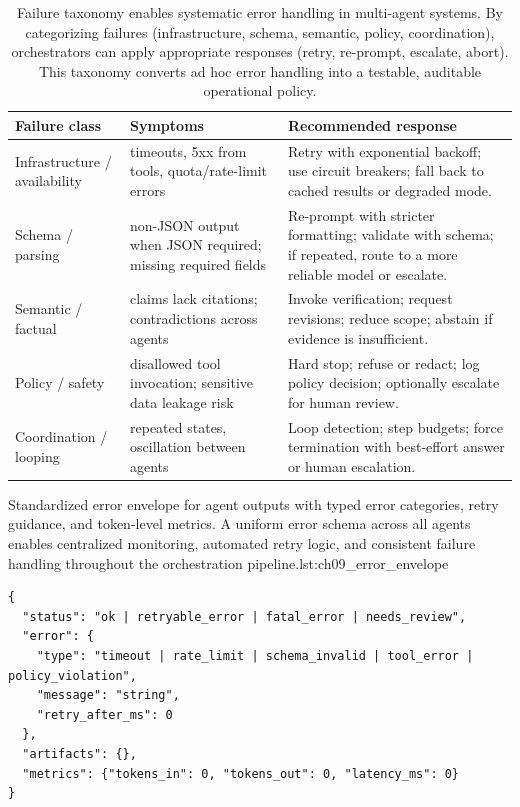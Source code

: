 \begin{table}[t]
\centering
\small
\caption{Failure taxonomy enables systematic error handling in multi-agent systems. By categorizing failures (infrastructure, schema, semantic, policy, coordination), orchestrators can apply appropriate responses (retry, re-prompt, escalate, abort). This taxonomy converts ad hoc error handling into a testable, auditable operational policy.}
\label{tab:ch09_agent_failure_taxonomy}
\setlength{\tabcolsep}{6pt}
\renewcommand{\arraystretch}{1.3}
\begin{tabularx}{\linewidth}{@{}p{3.3cm}X X@{}}
\toprule
\rowcolor{gray!15}
\textbf{Failure class} & \textbf{Symptoms} & \textbf{Recommended response} \\
\midrule
Infrastructure / availability &
timeouts, 5xx from tools, quota/rate-limit errors &
Retry with exponential backoff; use circuit breakers; fall back to cached results or degraded mode. \\
Schema / parsing &
non-JSON output when JSON required; missing required fields &
Re-prompt with stricter formatting; validate with schema; if repeated, route to a more reliable model or escalate. \\
Semantic / factual &
claims lack citations; contradictions across agents &
Invoke verification; request revisions; reduce scope; abstain if evidence is insufficient. \\
Policy / safety &
disallowed tool invocation; sensitive data leakage risk &
Hard stop; refuse or redact; log policy decision; optionally escalate for human review. \\
Coordination / looping &
repeated states, oscillation between agents &
Loop detection; step budgets; force termination with best-effort answer or human escalation. \\
\bottomrule
\end{tabularx}
\end{table}

\begin{codebox}{Standardized error envelope for agent outputs with typed error categories, retry guidance, and token-level metrics. A uniform error schema across all agents enables centralized monitoring, automated retry logic, and consistent failure handling throughout the orchestration pipeline.}{lst:ch09_error_envelope}
\begin{verbatim}
{
  "status": "ok | retryable_error | fatal_error | needs_review",
  "error": {
    "type": "timeout | rate_limit | schema_invalid | tool_error | policy_violation",
    "message": "string",
    "retry_after_ms": 0
  },
  "artifacts": {},
  "metrics": {"tokens_in": 0, "tokens_out": 0, "latency_ms": 0}
}
\end{verbatim}
\end{codebox}

